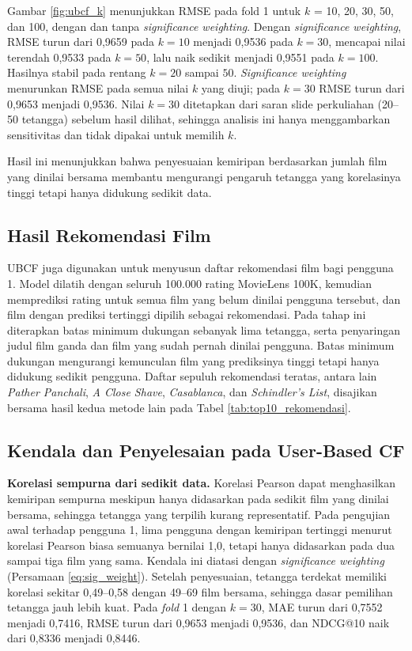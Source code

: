 Gambar \ref{fig:ubcf_k} menunjukkan RMSE pada fold 1 untuk $k$ = 10, 20, 30, 50, dan 100, dengan dan tanpa \textit{significance weighting}. Dengan \textit{significance weighting}, RMSE turun dari 0,9659 pada $k=10$ menjadi 0,9536 pada $k=30$, mencapai nilai terendah 0,9533 pada $k=50$, lalu naik sedikit menjadi 0,9551 pada $k=100$. Hasilnya stabil pada rentang $k = 20$ sampai $50$. \textit{Significance weighting} menurunkan RMSE pada semua nilai $k$ yang diuji; pada $k=30$ RMSE turun dari 0,9653 menjadi 0,9536. Nilai $k=30$ ditetapkan dari saran slide perkuliahan (20--50 tetangga) sebelum hasil dilihat, sehingga analisis ini hanya menggambarkan sensitivitas dan tidak dipakai untuk memilih $k$.

Hasil ini menunjukkan bahwa penyesuaian kemiripan berdasarkan jumlah film yang dinilai bersama membantu mengurangi pengaruh tetangga yang korelasinya tinggi tetapi hanya didukung sedikit data.

\subsection{Hasil Rekomendasi Film}
UBCF juga digunakan untuk menyusun daftar rekomendasi film bagi pengguna 1. Model dilatih dengan seluruh 100.000 rating MovieLens 100K, kemudian memprediksi rating untuk semua film yang belum dinilai pengguna tersebut, dan film dengan prediksi tertinggi dipilih sebagai rekomendasi. Pada tahap ini diterapkan batas minimum dukungan sebanyak lima tetangga, serta penyaringan judul film ganda dan film yang sudah pernah dinilai pengguna. Batas minimum dukungan mengurangi kemunculan film yang prediksinya tinggi tetapi hanya didukung sedikit pengguna. Daftar sepuluh rekomendasi teratas, antara lain \textit{Pather Panchali}, \textit{A Close Shave}, \textit{Casablanca}, dan \textit{Schindler's List}, disajikan bersama hasil kedua metode lain pada Tabel \ref{tab:top10_rekomendasi}.

\subsection{Kendala dan Penyelesaian pada User-Based CF}
\textbf{Korelasi sempurna dari sedikit data.} Korelasi Pearson dapat menghasilkan kemiripan sempurna meskipun hanya didasarkan pada sedikit film yang dinilai bersama, sehingga tetangga yang terpilih kurang representatif. Pada pengujian awal terhadap pengguna 1, lima pengguna dengan kemiripan tertinggi menurut korelasi Pearson biasa semuanya bernilai 1,0, tetapi hanya didasarkan pada dua sampai tiga film yang sama. Kendala ini diatasi dengan \textit{significance weighting} (Persamaan \ref{eq:sig_weight}). Setelah penyesuaian, tetangga terdekat memiliki korelasi sekitar 0,49--0,58 dengan 49--69 film bersama, sehingga dasar pemilihan tetangga jauh lebih kuat. Pada \textit{fold} 1 dengan $k=30$, MAE turun dari 0,7552 menjadi 0,7416, RMSE turun dari 0,9653 menjadi 0,9536, dan NDCG@10 naik dari 0,8336 menjadi 0,8446.

